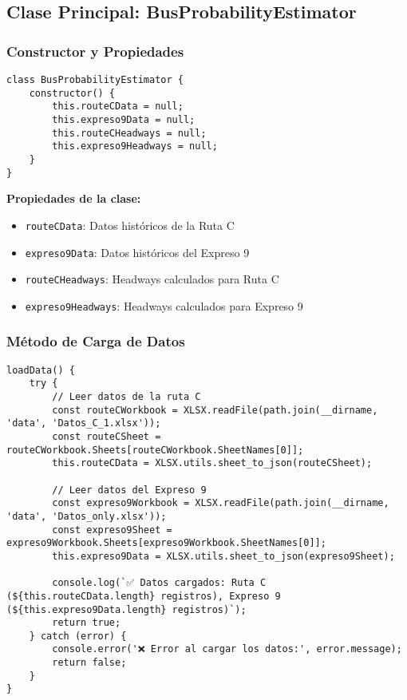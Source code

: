 \documentclass[12pt,a4paper]{article}
\begin{document}
\subsection{Clase Principal: BusProbabilityEstimator}

\subsubsection{Constructor y Propiedades}

\begin{lstlisting}[caption=Constructor de la clase principal]
class BusProbabilityEstimator {
    constructor() {
        this.routeCData = null;
        this.expreso9Data = null;
        this.routeCHeadways = null;
        this.expreso9Headways = null;
    }
}
\end{lstlisting}

\textbf{Propiedades de la clase:}
\begin{itemize}
    \item \texttt{routeCData}: Datos históricos de la Ruta C
    \item \texttt{expreso9Data}: Datos históricos del Expreso 9
    \item \texttt{routeCHeadways}: Headways calculados para Ruta C
    \item \texttt{expreso9Headways}: Headways calculados para Expreso 9
\end{itemize}

\subsubsection{Método de Carga de Datos}

\begin{lstlisting}[caption=Método loadData()]
loadData() {
    try {
        // Leer datos de la ruta C
        const routeCWorkbook = XLSX.readFile(path.join(__dirname, 'data', 'Datos_C_1.xlsx'));
        const routeCSheet = routeCWorkbook.Sheets[routeCWorkbook.SheetNames[0]];
        this.routeCData = XLSX.utils.sheet_to_json(routeCSheet);

        // Leer datos del Expreso 9
        const expreso9Workbook = XLSX.readFile(path.join(__dirname, 'data', 'Datos_only.xlsx'));
        const expreso9Sheet = expreso9Workbook.Sheets[expreso9Workbook.SheetNames[0]];
        this.expreso9Data = XLSX.utils.sheet_to_json(expreso9Sheet);

        console.log(`✅ Datos cargados: Ruta C (${this.routeCData.length} registros), Expreso 9 (${this.expreso9Data.length} registros)`);
        return true;
    } catch (error) {
        console.error('❌ Error al cargar los datos:', error.message);
        return false;
    }
}
\end{lstlisting}
\end{document}
